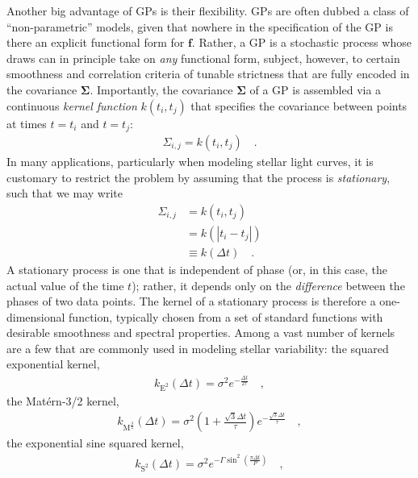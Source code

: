 \documentclass[modern]{aastex62}
\begin{document}
Another big advantage of GPs is their flexibility. GPs are often dubbed
a class of ``non-parametric'' models, given that nowhere in the specification
of the GP is there an explicit functional form for $\mathbf{f}$. Rather, a GP
is a stochastic
process whose draws can in principle take on \emph{any} functional form,
subject, however, to certain smoothness and correlation criteria
of tunable strictness
that are fully
encoded in the covariance $\pmb{\Sigma}$. Importantly, the covariance
$\pmb{\Sigma}$ of a GP is assembled via a continuous \emph{kernel function} $k(t_i, t_j)$
that specifies the covariance between points at times $t = t_i$ and $t = t_j$:
%
\begin{align}
    \Sigma_{i,j} = k(t_i, t_j)
    \quad.
\end{align}
%
In many applications, particularly when modeling stellar light curves,
it is customary to restrict the problem by
assuming that the process is \emph{stationary}, such that we may write
%
\begin{align}
    \Sigma_{i,j} & = k(t_i, t_j)
    \nonumber                                    \\
                 & = k(\left| t_i - t_j \right|)
    \nonumber                                    \\
                 & \equiv k(\Delta t)
    \quad.
\end{align}
%
A stationary process is one that is independent of phase (or, in this case,
the actual value of the time $t$); rather, it depends only on the \emph{difference}
between the phases of two data points. The kernel of a stationary process is
therefore a one-dimensional function, typically chosen from a set of
standard functions with desirable smoothness and spectral properties.
Among a vast number of kernels are a few that are commonly used
in modeling stellar variability: the squared exponential kernel,
%
\begin{align}
    k_\mathrm{E^2}(\Delta t) = \sigma^2 e^{-\frac{\Delta t}{2\tau}}
    \quad,
\end{align}
%
the Mat\'ern-3/2 kernel,
%
\begin{align}
    k_\mathrm{M^\frac{3}{2}}(\Delta t) = \sigma^2 \left( 1 + \frac{\sqrt{3}\Delta t}{\tau} \right) e^{-\frac{\sqrt{3}\Delta t}{\tau}}
    \quad,
\end{align}
%
the exponential sine squared kernel,
%
\begin{align}
    k_\mathrm{S^2}(\Delta t) = \sigma^2 e^{-\Gamma\sin^2\left( \frac{\pi \Delta t}{P} \right)}
    \quad,
\end{align}
\end{document}
